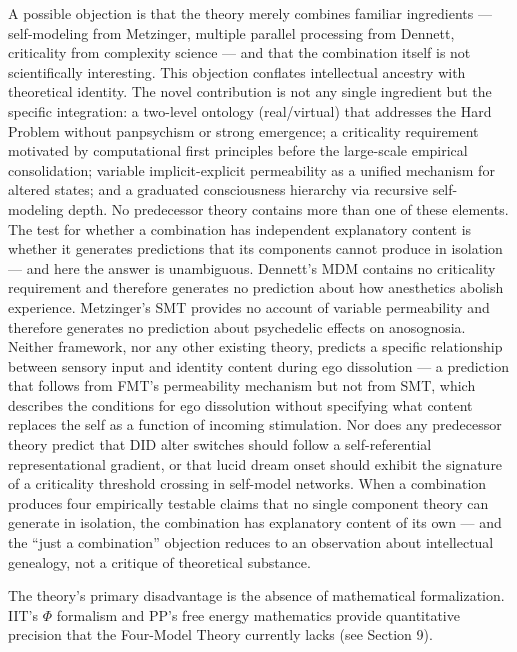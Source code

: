 \documentclass[12pt]{article}
\begin{document}
A possible objection is that the theory merely combines familiar ingredients --- self-modeling from Metzinger, multiple parallel processing from Dennett, criticality from complexity science --- and that the combination itself is not scientifically interesting. This objection conflates intellectual ancestry with theoretical identity. The novel contribution is not any single ingredient but the specific integration: a two-level ontology (real/virtual) that addresses the Hard Problem without panpsychism or strong emergence; a criticality requirement motivated by computational first principles before the large-scale empirical consolidation; variable implicit-explicit permeability as a unified mechanism for altered states; and a graduated consciousness hierarchy via recursive self-modeling depth. No predecessor theory contains more than one of these elements. The test for whether a combination has independent explanatory content is whether it generates predictions that its components cannot produce in isolation --- and here the answer is unambiguous. Dennett's MDM contains no criticality requirement and therefore generates no prediction about how anesthetics abolish experience. Metzinger's SMT provides no account of variable permeability and therefore generates no prediction about psychedelic effects on anosognosia. Neither framework, nor any other existing theory, predicts a specific relationship between sensory input and identity content during ego dissolution --- a prediction that follows from FMT's permeability mechanism but not from SMT, which describes the conditions for ego dissolution without specifying what content replaces the self as a function of incoming stimulation. Nor does any predecessor theory predict that DID alter switches should follow a self-referential representational gradient, or that lucid dream onset should exhibit the signature of a criticality threshold crossing in self-model networks. When a combination produces four empirically testable claims that no single component theory can generate in isolation, the combination has explanatory content of its own --- and the ``just a combination'' objection reduces to an observation about intellectual genealogy, not a critique of theoretical substance.

The theory's primary disadvantage is the absence of mathematical formalization. IIT's $\Phi$ formalism and PP's free energy mathematics provide quantitative precision that the Four-Model Theory currently lacks (see Section 9).
\end{document}

